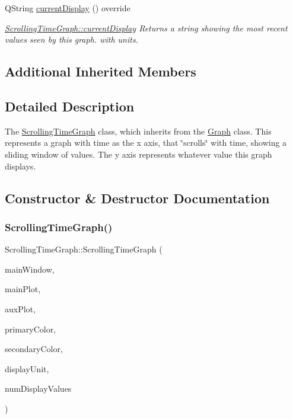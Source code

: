 \begin{DoxyCompactItemize}
Q\+String \hyperlink{class_scrolling_time_graph_ae27ff79b4314b792ecdd27fc6115e0bf}{current\+Display} () override
\begin{DoxyCompactList}\small\item\em \hyperlink{class_scrolling_time_graph_ae27ff79b4314b792ecdd27fc6115e0bf}{Scrolling\+Time\+Graph\+::current\+Display} Returns a string showing the most recent values seen by this graph. with units. \end{DoxyCompactList}\end{DoxyCompactItemize}
\subsection*{Additional Inherited Members}


\subsection{Detailed Description}
The \hyperlink{class_scrolling_time_graph}{Scrolling\+Time\+Graph} class, which inherits from the \hyperlink{class_graph}{Graph} class. This represents a graph with time as the x axis, that \char`\"{}scrolls\char`\"{} with time, showing a sliding window of values. The y axis represents whatever value this graph displays. 

\subsection{Constructor \& Destructor Documentation}
\hypertarget{class_scrolling_time_graph_ac7af242514d5770d99d90743a24163ca}{}\label{class_scrolling_time_graph_ac7af242514d5770d99d90743a24163ca} 
\subsubsection{\texorpdfstring{Scrolling\+Time\+Graph()}{ScrollingTimeGraph()}}
{\footnotesize\ttfamily Scrolling\+Time\+Graph\+::\+Scrolling\+Time\+Graph (\begin{DoxyParamCaption}\item[{Q\+Main\+Window $\ast$}]{main\+Window,  }\item[{Q\+Custom\+Plot $\ast$}]{main\+Plot,  }\item[{Q\+Custom\+Plot $\ast$}]{aux\+Plot,  }\item[{Q\+Color}]{primary\+Color,  }\item[{Q\+Color}]{secondary\+Color,  }\item[{Q\+String}]{display\+Unit,  }\item[{int}]{num\+Display\+Values }\end{DoxyParamCaption})}



